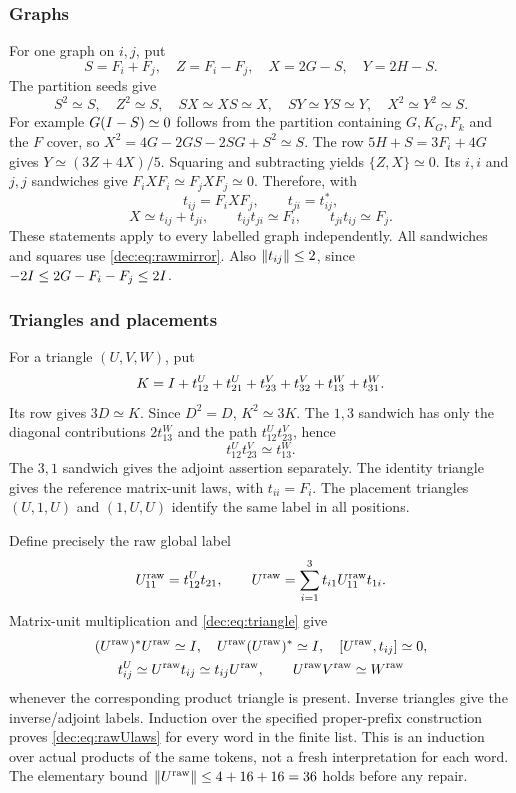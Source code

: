 \subsubsection{Graphs}
For one graph on $i,j$, put
\[
S=F_i+F_j,\quad Z=F_i-F_j,\quad X=2G-S,\quad Y=2H-S.
\]
The partition seeds give
\[
S^2\simeq S,\quad Z^2\simeq S,\quad SX\simeq XS\simeq X,
\quad SY\simeq YS\simeq Y,\quad X^2\simeq Y^2\simeq S.
\]
For example $G(I-S)\simeq0$ follows from the partition containing $G,K_G,F_k$ and the $F$ cover, so
$X^2=4G-2GS-2SG+S^2\simeq S$. The row $5H+S=3F_i+4G$ gives
$Y\simeq(3Z+4X)/5$. Squaring and subtracting yields $\{Z,X\}\simeq0$. Its $i,i$ and $j,j$ sandwiches give
$F_iXF_i\simeq F_jXF_j\simeq0$. Therefore, with
\[
t_{ij}=F_iXF_j,\qquad t_{ji}=t_{ij}^*,
\]
\begin{equation}\label{dec:eq:graphlaws}
X\simeq t_{ij}+t_{ji},\qquad
t_{ij}t_{ji}\simeq F_i,\qquad t_{ji}t_{ij}\simeq F_j.
\end{equation}
These statements apply to every labelled graph independently. All sandwiches and squares use \eqref{dec:eq:rawmirror}. Also $\left\lVert t_{ij}\right\rVert\le2$, since $-2I\le2G-F_i-F_j\le2I$.

\subsubsection{Triangles and placements}
For a triangle $(U,V,W)$, put
\[
K=I+t_{12}^{U}+t_{21}^{U}+t_{23}^{V}+t_{32}^{V}+t_{13}^{W}+t_{31}^{W}.
\]
Its row gives $3D\simeq K$. Since $D^2=D$, $K^2\simeq3K$. The $1,3$ sandwich has only the diagonal contributions $2t_{13}^{W}$ and the path $t_{12}^{U}t_{23}^{V}$, hence
\begin{equation}\label{dec:eq:triangle}
t_{12}^{U}t_{23}^{V}\simeq t_{13}^{W}.
\end{equation}
The $3,1$ sandwich gives the adjoint assertion separately. The identity triangle gives the reference matrix-unit laws, with $t_{ii}=F_i$. The placement triangles $(U,1,U)$ and $(1,U,U)$ identify the same label in all positions.

Define precisely the raw global label
\begin{equation}\label{dec:eq:rawU}
U_{11}^{\mathrm{raw}}=t_{12}^{U}t_{21},\qquad
U^{\mathrm{raw}}=\sum_{i=1}^3t_{i1}U_{11}^{\mathrm{raw}}t_{1i}.
\end{equation}
Matrix-unit multiplication and \eqref{dec:eq:triangle} give
\begin{equation}\label{dec:eq:rawUlaws}
\begin{gathered}
(U^{\mathrm{raw}})^*U^{\mathrm{raw}}\simeq I,\quad U^{\mathrm{raw}}(U^{\mathrm{raw}})^*\simeq I,
\quad[U^{\mathrm{raw}},t_{ij}]\simeq0,\\
t_{ij}^{U}\simeq U^{\mathrm{raw}}t_{ij}\simeq t_{ij}U^{\mathrm{raw}},\qquad
U^{\mathrm{raw}}V^{\mathrm{raw}}\simeq W^{\mathrm{raw}}
\end{gathered}
\end{equation}
whenever the corresponding product triangle is present. Inverse triangles give the inverse/adjoint labels. Induction over the specified proper-prefix construction proves \eqref{dec:eq:rawUlaws} for every word in the finite list. This is an induction over actual products of the same tokens, not a fresh interpretation for each word. The elementary bound $\left\lVert U^{\mathrm{raw}}\right\rVert\le4+16+16=36$ holds before any repair.

